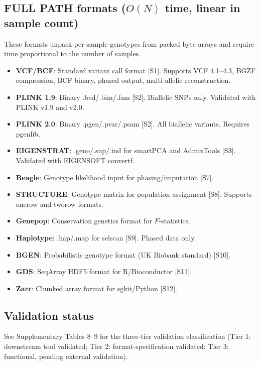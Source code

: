 \documentclass[11pt,a4paper]{article}
\begin{document}
\subsection*{FULL PATH formats ($O(N)$ time, linear in sample count)}

These formats unpack per-sample genotypes from packed byte arrays and require time proportional to the number of samples.

\begin{itemize}
\item \textbf{VCF/BCF}: Standard variant call format [S1]. Supports VCF 4.1--4.3, BGZF compression, BCF binary, phased output, multi-allelic reconstruction.
\item \textbf{PLINK 1.9}: Binary .bed/.bim/.fam [S2]. Biallelic SNPs only. Validated with PLINK v1.9 and v2.0.
\item \textbf{PLINK 2.0}: Binary .pgen/.pvar/.psam [S2]. All biallelic variants. Requires pgenlib.
\item \textbf{EIGENSTRAT}: .geno/.snp/.ind for smartPCA and AdmixTools [S3]. Validated with EIGENSOFT convertf.
\item \textbf{Beagle}: Genotype likelihood input for phasing/imputation [S7].
\item \textbf{STRUCTURE}: Genotype matrix for population assignment [S8]. Supports onerow and tworow formats.
\item \textbf{Genepop}: Conservation genetics format for $F$-statistics.
\item \textbf{Haplotype}: .hap/.map for selscan [S9]. Phased data only.
\item \textbf{BGEN}: Probabilistic genotype format (UK Biobank standard) [S10].
\item \textbf{GDS}: SeqArray HDF5 format for R/Bioconductor [S11].
\item \textbf{Zarr}: Chunked array format for sgkit/Python [S12].
\end{itemize}

\subsection*{Validation status}

See Supplementary Tables 8--9 for the three-tier validation classification (Tier 1: downstream tool validated; Tier 2: format-specification validated; Tier 3: functional, pending external validation).

\newpage

\end{document}
